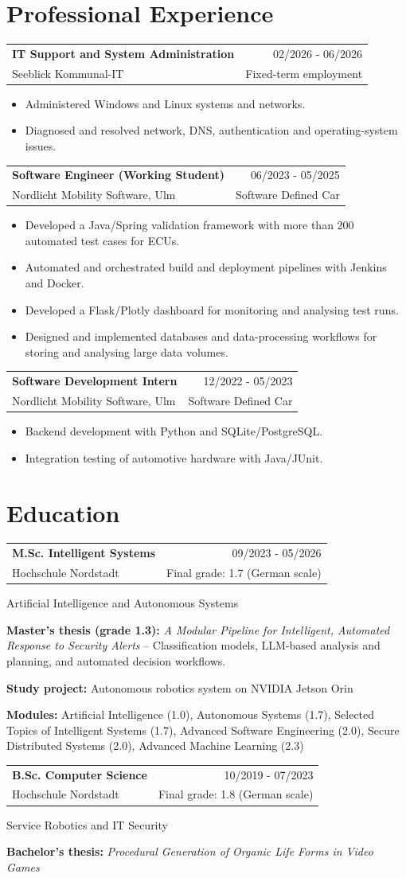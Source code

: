 \documentclass[10pt,a4paper]{article}
\makeatletter
\newcommand{\entry}[4]{%
  \begin{tabular*}{\linewidth}{@{}l@{\extracolsep{\fill}}r@{}}
    \textbf{#1} & {\small\color{grey}#2}\\
    {\small #3} & {\small\color{grey}#4}
  \end{tabular*}\par\nopagebreak[4]}
\newcommand{\note}[2]{{\small\textbf{#1:} #2}\par}
\makeatother
\begin{document}
\section{Professional Experience}
\entry{IT Support and System Administration}{02/2026 - 06/2026}{Seeblick Kommunal-IT}{Fixed-term employment}
\begin{itemize}
  \item Administered Windows and Linux systems and networks.
  \item Diagnosed and resolved network, DNS, authentication and operating-system issues.
\end{itemize}
\vspace{4pt}
\entry{Software Engineer (Working Student)}{06/2023 - 05/2025}{Nordlicht Mobility Software, Ulm}{Software Defined Car}
\begin{itemize}
  \item Developed a Java/Spring validation framework with more than 200 automated test cases for ECUs.
  \item Automated and orchestrated build and deployment pipelines with Jenkins and Docker.
  \item Developed a Flask/Plotly dashboard for monitoring and analysing test runs.
  \item Designed and implemented databases and data-processing workflows for storing and analysing large data volumes.
\end{itemize}
\vspace{4pt}
\entry{Software Development Intern}{12/2022 - 05/2023}{Nordlicht Mobility Software, Ulm}{Software Defined Car}
\begin{itemize}
  \item Backend development with Python and SQLite/PostgreSQL.
  \item Integration testing of automotive hardware with Java/JUnit.
\end{itemize}

\section{Education}
\entry{M.Sc. Intelligent Systems}{09/2023 - 05/2026}{Hochschule Nordstadt}{Final grade: 1.7 (German scale)}
\vspace{1pt}
{\small Artificial Intelligence and Autonomous Systems}\par
\note{Master's thesis (grade 1.3)}{\textit{A Modular Pipeline for Intelligent, Automated Response to Security Alerts} -- Classification models, LLM-based analysis and planning, and automated decision workflows.}
\note{Study project}{Autonomous robotics system on NVIDIA Jetson Orin}
\note{Modules}{Artificial Intelligence (1.0), Autonomous Systems (1.7), Selected Topics of Intelligent Systems (1.7), Advanced Software Engineering (2.0), Secure Distributed Systems (2.0), Advanced Machine Learning (2.3)}
\vspace{4pt}
\entry{B.Sc. Computer Science}{10/2019 - 07/2023}{Hochschule Nordstadt}{Final grade: 1.8 (German scale)}
\vspace{1pt}
{\small Service Robotics and IT Security}\par
\note{Bachelor's thesis}{\textit{Procedural Generation of Organic Life Forms in Video Games}}
\end{document}
